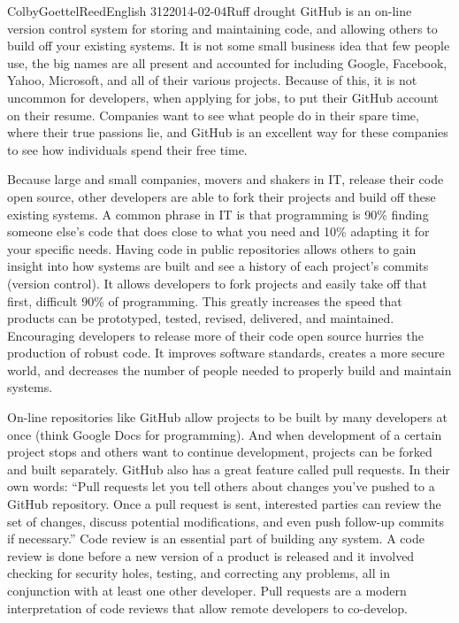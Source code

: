 \documentclass[12pt]{article}
\begin{document}
\begin{mla}{Colby}{Goettel}{Reed}{English 312}{2014-02-04}{Ruff drought}
GitHub is an on-line version control system for storing and maintaining code, and allowing others to build off your existing systems. It is not some small business idea that few people use, the big names are all present and accounted for including Google, Facebook, Yahoo, Microsoft, and all of their various projects. Because of this, it is not uncommon for developers, when applying for jobs, to put their GitHub account on their resume. Companies want to see what people do in their spare time, where their true passions lie, and GitHub is an excellent way for these companies to see how individuals spend their free time.

Because large and small companies, movers and shakers in IT, release their code open source, other developers are able to fork their projects and build off these existing systems. A common phrase in IT is that programming is 90\% finding someone else's code that does close to what you need and 10\% adapting it for your specific needs. Having code in public repositories allows others to gain insight into how systems are built and see a history of each project's commits (version control). It allows developers to fork projects and easily take off that first, difficult 90\% of programming. This greatly increases the speed that products can be prototyped, tested, revised, delivered, and maintained. Encouraging developers to release more of their code open source hurries the production of robust code. It improves software standards, creates a more secure world, and decreases the number of people needed to properly build and maintain systems.


On-line repositories like GitHub allow projects to be built by many developers at once (think Google Docs for programming). And when development of a certain project stops and others want to continue development, projects can be forked and built separately. GitHub also has a great feature called pull requests. In their own words: ``Pull requests let you tell others about changes you've pushed to a GitHub repository. Once a pull request is sent, interested parties can review the set of changes, discuss potential modifications, and even push follow-up commits if necessary.'' Code review is an essential part of building any system. A code review is done before a new version of a product is released and it involved checking for security holes, testing, and correcting any problems, all in conjunction with at least one other developer. Pull requests are a modern interpretation of code reviews that allow remote developers to co-develop.


\end{mla}
\end{document}
